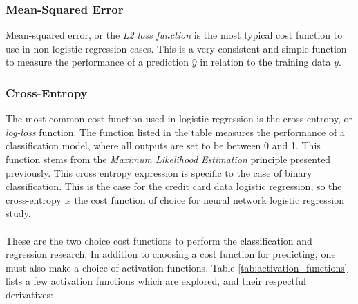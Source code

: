        \subsubsection{Mean-Squared Error}
            Mean-squared error, or the \textit{L2 loss function} is the most typical cost function to use in non-logistic regression cases. This is a very consistent and simple function to measure the performance of a prediction $\hat{y}$ in relation to the training data $y$.
        \subsubsection{Cross-Entropy}
            The most common cost function used in logistic regression is the cross entropy, or \textit{log-loss} function. The function listed in the table measures the performance of a classification model, where all outputs are set to be between 0 and 1. This function stems from the \textit{Maximum Likelihood Estimation} principle presented previously.
            This cross entropy expression is specific to the case of binary classification. 
            This is the case for the credit card data logistic regression, so the cross-entropy is the cost function of choice for neural network logistic regression study. \\\\
	        These are the two choice cost functions to perform the classification and regression research. In addition to choosing a cost function for predicting, one must also make a choice of activation functions. Table \ref{tab:activation_functions} lists a few activation functions which are explored, and their respectful derivatives:

